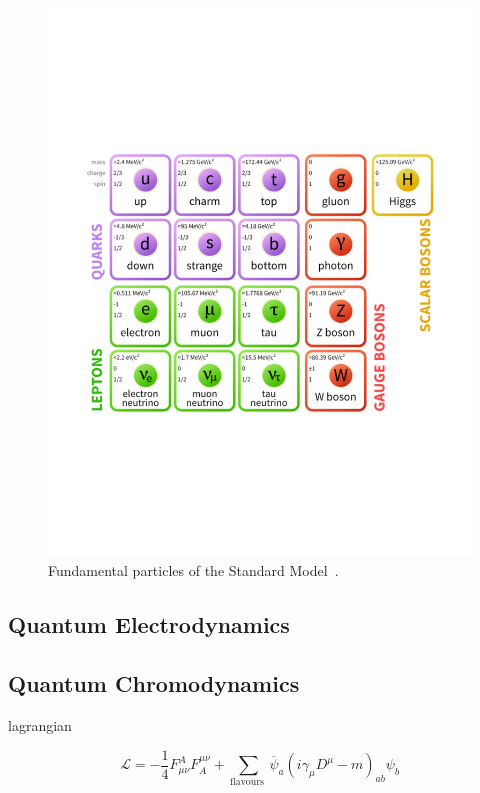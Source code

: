 \begin{figure}[htb]
\centering
\includegraphics[width=1.0\textwidth]{smdiagram.pdf}
\caption{Fundamental particles of the Standard Model~\cite{modellinginvisible}.}
\label{fig:SM}
\end{figure}


\subsection{Quantum Electrodynamics}\label{secQED}





\subsection{Quantum Chromodynamics}\label{secQCD}


lagrangian

\begin{equation}
\mathcal{L}=-\frac{1}{4} F_{\mu \nu}^{A} F_{A}^{\mu \nu}+\sum_{\text {flavours }} \overline{\psi}_{a}\left(i \gamma_{\mu} D^{\mu}-m\right)_{a b} \psi_{b}
\end{equation}

